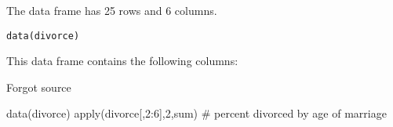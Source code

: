 \begin{Description}\relax
The  data frame has 25 rows and 6 columns.
\end{Description}
\begin{Usage}
\begin{verbatim}data(divorce)\end{verbatim}
\end{Usage}
\begin{Format}\relax
This data frame contains the following columns:
\end{Format}
\begin{Source}\relax
Forgot source
\end{Source}
\begin{Examples}
\begin{ExampleCode}
data(divorce)
apply(divorce[,2:6],2,sum)      # percent divorced by age of marriage
\end{ExampleCode}
\end{Examples}

